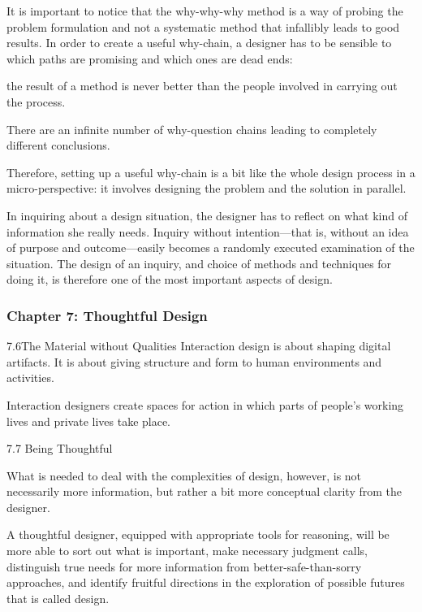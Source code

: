 It is important to notice that the why-why-why method is a way of probing the problem formulation and not a systematic method that infallibly leads to good results. In order to create a useful why-chain, a designer has to be sensible to which paths are promising and which ones are dead ends:



the result of a method is never better than the people involved in carrying out the process.

There are an infinite number of why-question chains leading to completely different conclusions.

Therefore, setting up a useful why-chain is a bit like the whole design process in a micro-perspective: it involves designing the problem and the solution in parallel.

In inquiring about a design situation, the designer has to reflect on what kind of information she really needs. Inquiry without intention—that is, without an idea of purpose and outcome—easily becomes a randomly executed examination of the situation. The design of an inquiry, and choice of methods and techniques for doing it, is therefore one of the most important aspects of design.

\subsubsection{Chapter 7: Thoughtful Design}

7.6The Material without Qualities Interaction design is about shaping digital artifacts.
It is about giving structure and form to human environments and activities.

Interaction designers create spaces for action in which parts of people’s working lives and private lives take place.

7.7 Being Thoughtful

What is needed to deal with the complexities of design, however, is not necessarily more information, but rather a bit more conceptual clarity from the designer.

A thoughtful designer, equipped with appropriate tools for reasoning, will be more able to sort out what is important, make necessary judgment calls, distinguish true needs for more information from better-safe-than-sorry approaches, and identify fruitful directions in the exploration of possible futures that is called design.

